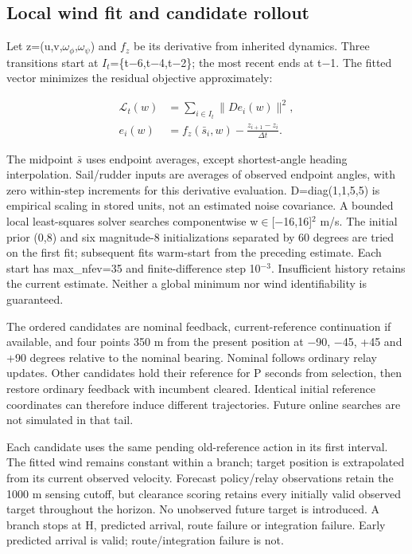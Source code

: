 \documentclass[conference]{IEEEtran}
\begin{document}
\subsection{Local wind fit and candidate rollout}

Let z=(u,v,$\omega_\phi$,$\omega_\psi$) and $f_z$ be its derivative from inherited dynamics. Three transitions start at $I_t$=\{t\ensuremath{-}6,t\ensuremath{-}4,t\ensuremath{-}2\}; the most recent ends at t\ensuremath{-}1. The fitted vector minimizes the residual objective approximately:

\begin{equation}\label{eq:2}
\begin{aligned}\mathcal L_t(w)&=\sum_{i\in I_t}\|D e_i(w)\|^2,\\e_i(w)&=f_z(\bar s_i,w)-\frac{z_{i+1}-z_i}{\Delta t}.\end{aligned}
\end{equation}

The midpoint $\bar s$ uses endpoint averages, except shortest-angle heading interpolation. Sail/rudder inputs are averages of observed endpoint angles, with zero within-step increments for this derivative evaluation. D=diag(1,1,5,5) is empirical scaling in stored units, not an estimated noise covariance. A bounded local least-squares solver searches componentwise w\ensuremath{\in}[\ensuremath{-}16,16]\ensuremath{^2} m/s. The initial prior (0,8) and six magnitude-8 initializations separated by 60 degrees are tried on the first fit; subsequent fits warm-start from the preceding estimate. Each start has max\_nfev=35 and finite-difference step 10$^{-3}$. Insufficient history retains the current estimate. Neither a global minimum nor wind identifiability is guaranteed.

The ordered candidates are nominal feedback, current-reference continuation if available, and four points 350 m from the present position at \ensuremath{-}90, \ensuremath{-}45, +45 and +90 degrees relative to the nominal bearing. Nominal follows ordinary relay updates. Other candidates hold their reference for P seconds from selection, then restore ordinary feedback with incumbent cleared. Identical initial reference coordinates can therefore induce different trajectories. Future online searches are not simulated in that tail.

Each candidate uses the same pending old-reference action in its first interval. The fitted wind remains constant within a branch; target position is extrapolated from its current observed velocity. Forecast policy/relay observations retain the 1000 m sensing cutoff, but clearance scoring retains every initially valid observed target throughout the horizon. No unobserved future target is introduced. A branch stops at H, predicted arrival, route failure or integration failure. Early predicted arrival is valid; route/integration failure is not.
\end{document}
